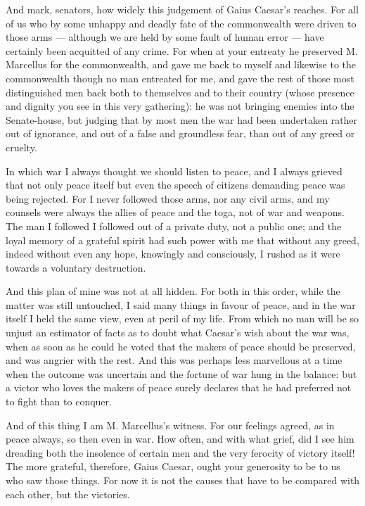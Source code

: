  And mark, senators, how widely this judgement of Gaius Caesar's reaches. For all of us who by some unhappy and deadly fate of the commonwealth were driven to those arms --- although we are held by some fault of human error --- have certainly been acquitted of any crime. For when at your entreaty he preserved M. Marcellus for the commonwealth, and gave me back to myself and likewise to the commonwealth though no man entreated for me, and gave the rest of those most distinguished men back both to themselves and to their country (whose presence and dignity you see in this very gathering): he was not bringing enemies into the Senate-house, but judging that by most men the war had been undertaken rather out of ignorance, and out of a false and groundless fear, than out of any greed or cruelty.

 In which war I always thought we should listen to peace, and I always grieved that not only peace itself but even the speech of citizens demanding peace was being rejected. For I never followed those arms, nor any civil arms, and my counsels were always the allies of peace and the toga, not of war and weapons. The man I followed I followed out of a private duty, not a public one; and the loyal memory of a grateful spirit had such power with me that without any greed, indeed without even any hope, knowingly and consciously, I rushed as it were towards a voluntary destruction.

 And this plan of mine was not at all hidden. For both in this order, while the matter was still untouched, I said many things in favour of peace, and in the war itself I held the same view, even at peril of my life. From which no man will be so unjust an estimator of facts as to doubt what Caesar's wish about the war was, when as soon as he could he voted that the makers of peace should be preserved, and was angrier with the rest. And this was perhaps less marvellous at a time when the outcome was uncertain and the fortune of war hung in the balance: but a victor who loves the makers of peace surely declares that he had preferred not to fight than to conquer.

 And of this thing I am M. Marcellus's witness. For our feelings agreed, as in peace always, so then even in war. How often, and with what grief, did I see him dreading both the insolence of certain men and the very ferocity of victory itself! The more grateful, therefore, Gaius Caesar, ought your generosity to be to us who saw those things. For now it is not the causes that have to be compared with each other, but the victories.

